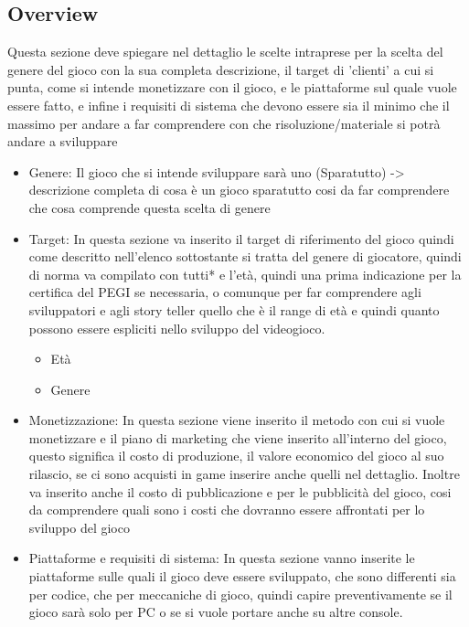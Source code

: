 \documentclass{report}
\begin{document}
\subsection{Overview}

Questa sezione deve spiegare nel dettaglio le scelte intraprese per la scelta del genere del gioco con la sua completa descrizione, il target di 'clienti' a cui si punta, come si intende monetizzare con il gioco, e le piattaforme sul quale vuole essere fatto, e infine i requisiti di sistema che devono essere sia il minimo che il massimo per andare a far comprendere con che risoluzione/materiale si potrà andare a sviluppare
\begin{itemize}
  \item Genere: Il gioco che si intende sviluppare sarà uno (Sparatutto) -> descrizione completa di cosa è un gioco sparatutto cosi da far comprendere che cosa comprende questa scelta di genere
  \item Target: In questa sezione va inserito il target di riferimento del gioco quindi come descritto nell'elenco sottostante si tratta del genere di giocatore, quindi di norma va compilato con tutti* e l'età, quindi una prima indicazione per la certifica del PEGI se necessaria, o comunque per far comprendere agli sviluppatori e agli story teller quello che è il range di età e quindi quanto possono essere espliciti nello sviluppo del videogioco.
  \begin{itemize}
    \item Età
    \item Genere
  \end{itemize}
  \item Monetizzazione:
  In questa sezione viene inserito il metodo con cui si vuole monetizzare e il piano di marketing che viene inserito all'interno del gioco, questo significa il costo di produzione, il valore economico del gioco al suo rilascio, se ci sono acquisti in game inserire anche quelli nel dettaglio. Inoltre va inserito anche il costo di pubblicazione e per le pubblicità del gioco, cosi da comprendere quali sono i costi che dovranno essere affrontati per lo sviluppo del gioco
  \item Piattaforme e requisiti di sistema:
  In questa sezione vanno inserite le piattaforme sulle quali il gioco deve essere sviluppato, che sono differenti sia per codice, che per meccaniche di gioco, quindi capire preventivamente se il gioco sarà solo per PC o se si vuole portare anche su altre console.


\end{itemize}
\end{document}
